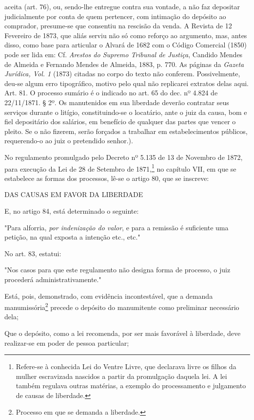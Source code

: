 {  aceita (art. 76), ou, sendo-lhe entregue contra sua vontade, a não faz
  depositar judicialmente por conta de quem pertencer, com intimação do
  depósito ao comprador, presume-se que consentiu na rescisão da venda.
  A Revista de 12 Fevereiro de 1873, que aliás serviu não só como
  reforço ao argumento, mas, antes disso, como base para articular o
  Alvará de 1682 com o Código Comercial (1850) pode ser lida em: Cf.
  \emph{Arestos do Supremo Tribunal de Justiça}, Candido Mendes de
  Almeida e Fernando Mendes de Almeida, 1883, p. 770. As páginas da
  \emph{Gazeta Jurídica, Vol. 1} (1873) citadas no corpo do texto não
  conferem. Possivelmente, deu-se algum erro tipográfico, motivo pelo
  qual não replicarei extratos delas aqui. Art. 81. O processo sumário é
  o indicado no art. 65 do dec. nº 4.824 de 22/11/1871. § 2º. Os
  manutenidos em sua liberdade deverão contratar seus serviços durante o
  litígio, constituindo-se o locatário, ante o juiz da causa, bom e fiel
  depositário dos salários, em benefício de qualquer das partes que
  vencer o pleito. Se o não fizerem, serão forçados a trabalhar em
  estabelecimentos públicos, requerendo-o ao juiz o pretendido senhor.}).

No regulamento promulgado pelo Decreto nº 5.135 de 13 de Novembro de
1872, para execução da Lei de 28 de Setembro de 1871,\footnote{
  Refere-se à conhecida Lei do Ventre Livre, que declarava livre os
  filhos da mulher escravizada nascidos a partir da promulgação daquela
  lei. A lei também regulava outras matérias, a exemplo do processamento
  e julgamento de causas de liberdade.} no capítulo VII, em que se
estabelece as formas dos processos, lê-se o artigo 80, que se inscreve:

DAS CAUSAS EM FAVOR DA LIBERDADE

E, no artigo 84, está determinado o seguinte:

"Para alforria, \emph{por indenização do valor}, e para a remissão é
suficiente uma petição, na qual exposta a intenção etc., etc."

No art. 83, estatui:

"Nos casos para que este regulamento não designa forma de processo, o
juiz procederá administrativamente."

Está, pois, demonstrado, com evidência incontestável, que a demanda
manumissória\footnote{Processo em que se demanda a liberdade.} precede
o depósito do manumitente como preliminar necessário dela;

Que o depósito, como a lei recomenda, por ser mais favorável à
liberdade, deve realizar-se em poder de pessoa particular;

